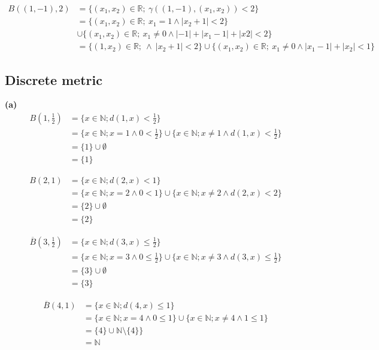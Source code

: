 \documentclass[12pt]{article}
\begin{document}
	\begin{align*}
		B((1,-1), 2) &= \{(x_{1}, x_{2}) \in \mathbb{R}; \ \gamma((1,-1),(x_{1}, x_{2}))<2\} \\
		&= \{(x_{1}, x_{2}) \in \mathbb{R}; \ x_{1} = 1 \land |x_{2}+1|<2\} \\
		&\cup \{(x_{1}, x_{2}) \in \mathbb{R}; \ x_{1} \neq 0 \land |-1| + |x_{1}-1| + |x{2}|<2\} \\
		&= \{(1, x_{2}) \in \mathbb{R}; \ \land \ |x_{2}+1|<2\} \cup \{(x_{1}, x_{2}) \in \mathbb{R}; \ x_{1} \neq 0 \land |x_{1}-1| + |x_{2}|<1\}
	\end{align*}
	

\subsection{Discrete metric} 
 \textbf{(a)}
    \begin{align*}
    	B(1,\frac{1}{2}) &= \{ x \in \mathbb{N}; d(1,x)<\frac{1}{2}\} \\
    	&= \{ x \in \mathbb{N}; x=1 \land 0<\frac{1}{2}\} \cup  \{ x \in \mathbb{N}; x \neq 1 \land d(1,x)<\frac{1}{2}\}  \\
    	&= \{1\} \cup \emptyset \\ 
    	&= \{1\}
    \end{align*}

 \begin{align*}
	B(2,1) &= \{ x \in \mathbb{N}; d(2,x)<1\} \\
	&= \{ x \in \mathbb{N}; x=2 \land 0<1\} \cup  \{ x \in \mathbb{N}; x \neq 2 \land d(2,x)<2\}  \\
	&= \{2\} \cup \emptyset \\ 
	&= \{2\}
\end{align*}

\begin{align*}
	\overline{B}(3,\frac{1}{2}) &= \{ x \in \mathbb{N}; d(3,x)\leq \frac{1}{2}\} \\
	&= \{ x \in \mathbb{N}; x=3 \land 0\leq \frac{1}{2}\} \cup  \{ x \in \mathbb{N}; x \neq 3 \land d(3,x)\leq \frac{1}{2}\}  \\
	&= \{3\} \cup \emptyset \\ 
	&= \{3\}
\end{align*}

\begin{align*}
	\overline{B}(4,1) &= \{ x \in \mathbb{N}; d(4,x)\leq 1\} \\
	&= \{ x \in \mathbb{N}; x=4 \land 0\leq1\} \cup  \{ x \in \mathbb{N}; x \neq 4 \land 1\leq 1\}  \\
	&= \{4\} \cup \mathbb{N} \setminus \{4\}\} \\ 
	&= \mathbb{N}
\end{align*}
\end{document}
